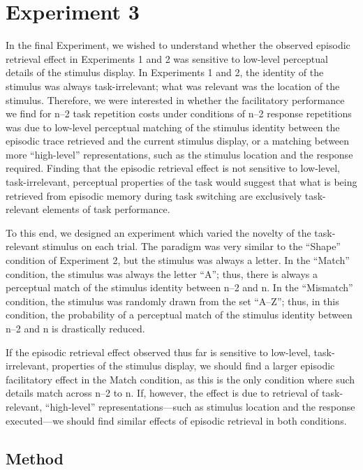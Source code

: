 \documentclass[a4paper, doc, natbib]{apa6}
\begin{document}
\section{Experiment 3}
In the final Experiment, we wished to understand whether the observed episodic retrieval effect in Experiments 1 and 2 was sensitive to low-level perceptual details of the stimulus display. In Experiments 1 and 2, the identity of the stimulus was always task-irrelevant; what was relevant was the location of the stimulus. Therefore, we were interested in whether the facilitatory performance we find for n--2 task repetition costs under conditions of n--2 response repetitions was due to low-level perceptual matching of the stimulus identity between the episodic trace retrieved and the current stimulus display, or a matching between more ``high-level'' representations, such as the stimulus location and the response required. Finding that the episodic retrieval effect is not sensitive to low-level, task-irrelevant, perceptual properties of the task would suggest that what is being retrieved from episodic memory during task switching are exclusively task-relevant elements of task performance. 

To this end, we designed an experiment which varied the novelty of the task-relevant stimulus on each trial. The paradigm was very similar to the ``Shape'' condition of Experiment 2, but the stimulus was always a letter. In the ``Match'' condition, the stimulus was always the letter ``A''; thus, there is always a perceptual match of the stimulus identity between n--2 and n. In the ``Mismatch'' condition, the stimulus was randomly drawn from the set ``A--Z''; thus, in this condition, the probability of a perceptual match of the stimulus identity between n--2 and n is drastically reduced. 

If the episodic retrieval effect observed thus far is sensitive to low-level, task-irrelevant, properties of the stimulus display, we should find a larger episodic facilitatory effect in the Match condition, as this is the only condition where such details match across n--2 to n. If, however, the effect is due to retrieval of task-relevant, ``high-level'' representations---such as stimulus location and the response executed---we should find similar effects of episodic retrieval in both conditions.

\subsection{Method}
\end{document}
